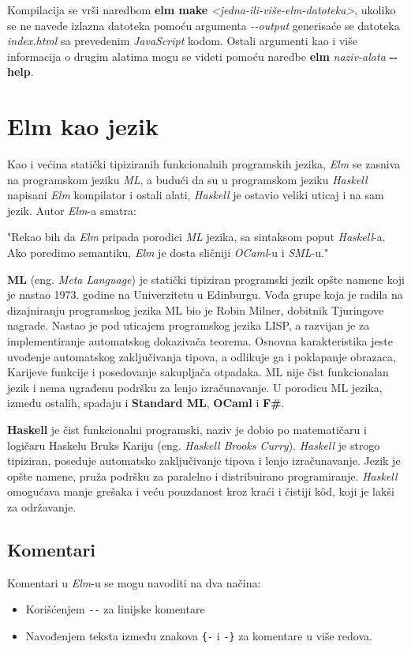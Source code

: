 \documentclass[12pt,oneside]{memoir}
\begin{document}
Kompilacija se vrši naredbom \textbf{elm make} \emph{<jedna-ili-više-elm-datoteka>},
ukoliko se ne navede izlazna datoteka pomoću argumenta \emph{-{}-output} generisaće 
se datoteka \emph{index.html} sa prevedenim \emph{JavaScript} kodom. Ostali argumenti kao i
više informacija o drugim alatima mogu se videti pomoću naredbe \textbf{elm}
\emph{naziv-alata} \textbf{-{}-help}.

\section{Elm kao jezik}
Kao i većina statički tipiziranih funkcionalnih programskih jezika, \emph{Elm} se zasniva na
programskom jeziku \emph{ML}, a budući da su u programskom jeziku \emph{Haskell} napisani \emph{Elm} kompilator
i ostali alati, \emph{Haskell} je ostavio veliki uticaj i na sam jezik. Autor \emph{Elm}-a smatra:
\begin{displayquote}
"Rekao bih da \emph{Elm} pripada porodici \emph{ML} jezika, sa sintaksom poput \emph{Haskell}-a. Ako poredimo semantiku,
\emph{Elm} je dosta sličniji \emph{OCaml}-u i \emph{SML}-u." \cite{eczaplicki:2015}
\end{displayquote}

\textbf{ML} (eng. \emph{Meta Language})\cite{ml} je statički tipiziran programski jezik opšte 
namene koji je nastao 1973. godine na Univerzitetu u Edinburgu. Vođa grupe koja je radila
na dizajniranju programskog jezika ML bio je Robin Milner, dobitnik Tjuringove nagrade.
Nastao je pod uticajem programskog jezika LISP, a razvijan je za implementiranje automatskog
dokazivača teorema. Osnovna karakteristika jeste uvođenje automatskog zaključivanja tipova, a
odlikuje ga i poklapanje obrazaca, Karijeve funkcije i posedovanje sakupljača otpadaka. ML
nije čist funkcionalan  jezik i nema ugrađenu podršku za lenjo izračunavanje. U porodicu ML 
jezika, između ostalih, spadaju i \textbf{Standard ML}, \textbf{OCaml} i \textbf{F{\#}}.


\textbf{Haskell}\cite{haskell} je čist funkcionalni programski, naziv je dobio po matematičaru i 
logičaru Haskelu Bruks Kariju (eng. \emph{Haskell Brooks Curry}). \emph{Haskell} je strogo 
tipiziran, poseduje automatsko zaključivanje tipova i lenjo izračunavanje. Jezik je 
opšte namene, pruža podršku za paralelno i distribuirano programiranje. \emph{Haskell} 
omogućava manje grešaka i veću pouzdanost kroz kraći i čistiji k\^{o}d, koji je lakši za
održavanje. 


\subsection{Komentari}
Komentari u \emph{Elm}-u se mogu navoditi na dva načina: \begin{itemize}
  \item Korišćenjem \texttt{-{}-} za linijske komentare
  \item Navođenjem teksta između znakova \texttt{\{-} i \texttt{-\}} za komentare u više redova.    
\end{itemize}
\end{document}
